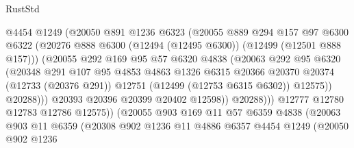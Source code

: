 \begin{lexlean}{RustStd}
\begin{coremodule}
                          @4454
                          @1249
                          (@20050
                            @891
                            @1236
                            @6323
                            (@20055
                              @889
                              @294
                              @157
                              @97
                              @6300
                              @6322
                              (@20276
                                @888
                                @6300
                                (@12494 (@12495 @6300))
                                (@12499 (@12501 @888 @157)))
                              (@20055
                                @292
                                @169
                                @95
                                @57
                                @6320
                                @4838
                                (@20063
                                  @292
                                  @95
                                  @6320
                                  (@20348
                                    @291
                                    @107
                                    @95
                                    @4853
                                    @4863
                                    @1326
                                    @6315
                                    @20366
                                    @20370
                                    @20374
                                    (@12733 (@20376 @291))
                                    @12751
                                    (@12499 (@12753 @6315 @6302))
                                    @12575))
                                @20288)))
                          @20393
                          @20396
                          @20399
                          @20402
                          @12598))
                      @20288)))
                @12777
                @12780
                @12783
                @12786
                @12575))
            (@20055
              @903
              @169
              @11
              @57
              @6359
              @4838
              (@20063
                @903
                @11
                @6359
                (@20308
                  @902
                  @1236
                  @11
                  @4886
                  @6357
                  @4454
                  @1249
                  (@20050
                    @902
                    @1236

\end{coremodule}
\end{lexlean}
